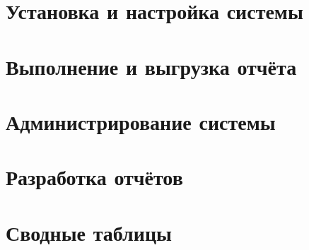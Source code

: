 \documentclass[a4paper, 11pt]{scrbook}
\begin{document}
	
	
	
	
	
	\tableofcontents

	\chapter{Установка и настройка системы} \label{chapter:installation-and-settings}
	
	
	\chapter{Выполнение и выгрузка отчёта} \label{chapter:report-running}
		
	
	\chapter{Администрирование системы} \label{chapter:administration}
	
	
	\chapter{Разработка отчётов} \label{chapter:developing}
	
	
	\chapter{Сводные таблицы} \label{chapter:pivot}
	
	
\end{document}
